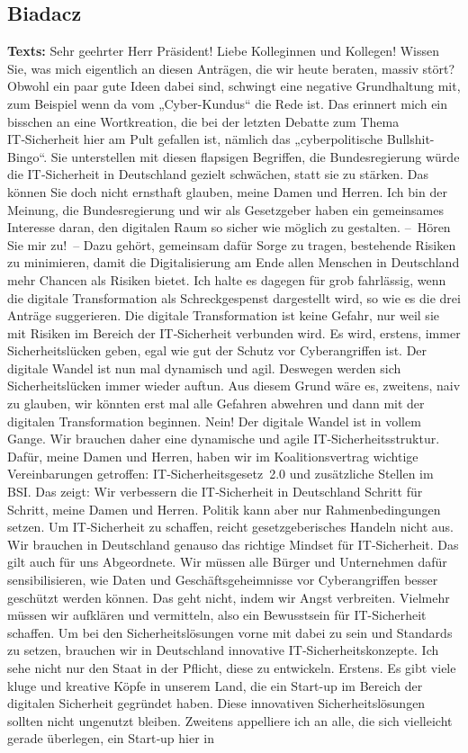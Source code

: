 \documentclass{article}
\begin{document}
\subsection{Biadacz}
\noindent\textbf{Texts:} Sehr geehrter Herr Präsident! Liebe Kolleginnen und Kollegen! Wissen Sie, was mich eigentlich an diesen Anträgen, die wir heute beraten, massiv stört?  Obwohl ein paar gute Ideen dabei sind, schwingt eine negative Grundhaltung mit,  zum Beispiel wenn da vom „Cyber-Kundus“ die Rede ist. Das erinnert mich ein bisschen an eine Wortkreation, die bei der letzten Debatte zum Thema IT‑Sicherheit hier am Pult gefallen ist, nämlich das „cyberpolitische Bull­shit-Bingo“.  Sie unterstellen mit diesen flapsigen Begriffen, die Bundesregierung würde die IT‑Sicherheit in Deutschland gezielt schwächen,  statt sie zu stärken. Das können Sie doch nicht ernsthaft glauben, meine Damen und Herren.  Ich bin der Meinung, die Bundesregierung und wir als Gesetzgeber haben ein gemeinsames Interesse daran, den digitalen Raum so sicher wie möglich zu gestalten.  – Hören Sie mir zu! – Dazu gehört, gemeinsam dafür Sorge zu tragen, bestehende Risiken zu minimieren, damit die Digitalisierung am Ende allen Menschen in Deutschland mehr Chancen als Risiken bietet.  Ich halte es dagegen für grob fahrlässig, wenn die digitale Transformation als Schreckgespenst dargestellt wird, so wie es die drei Anträge suggerieren. Die digitale Transformation ist keine Gefahr,  nur weil sie mit Risiken im Bereich der IT‑Sicherheit verbunden wird. Es wird, erstens, immer Sicherheitslücken geben,  egal wie gut der Schutz vor Cyberangriffen ist. Der digitale Wandel ist nun mal dynamisch und agil. Deswegen werden sich Sicherheitslücken immer wieder auftun. Aus diesem Grund wäre es, zweitens, naiv zu glauben, wir könnten erst mal alle Gefahren abwehren und dann mit der digitalen Transformation beginnen.  Nein! Der digitale Wandel ist in vollem Gange. Wir brauchen daher eine dynamische und agile IT‑Sicherheitsstruktur.  Dafür, meine Damen und Herren, haben wir im Koalitionsvertrag wichtige Vereinbarungen getroffen: IT‑Sicherheitsgesetz 2.0 und zusätzliche Stellen im BSI. Das zeigt: Wir verbessern die IT‑Sicherheit in Deutschland Schritt für Schritt, meine Damen und Herren. Politik kann aber nur Rahmenbedingungen setzen. Um IT‑Sicherheit zu schaffen, reicht gesetzgeberisches Handeln nicht aus. Wir brauchen in Deutschland genauso das richtige Mindset für IT‑Sicherheit.  Das gilt auch für uns Abgeordnete. Wir müssen alle Bürger und Unternehmen dafür sensibilisieren, wie Daten und Geschäftsgeheimnisse vor Cyberangriffen besser geschützt werden können.  Das geht nicht, indem wir Angst verbreiten. Vielmehr müssen wir aufklären und vermitteln, also ein Bewusstsein für IT-Sicherheit schaffen. Um bei den Sicherheitslösungen vorne mit dabei zu sein und Standards zu setzen, brauchen wir in Deutschland innovative IT‑Sicherheitskonzepte. Ich sehe nicht nur den Staat in der Pflicht, diese zu entwickeln. Erstens. Es gibt viele kluge und kreative Köpfe in unserem Land, die ein Start-up im Bereich der digitalen Sicherheit gegründet haben.  Diese innovativen Sicherheitslösungen sollten nicht ungenutzt bleiben. Zweitens appelliere ich an alle, die sich vielleicht gerade überlegen, ein Start‑up hier in 
\end{document}
